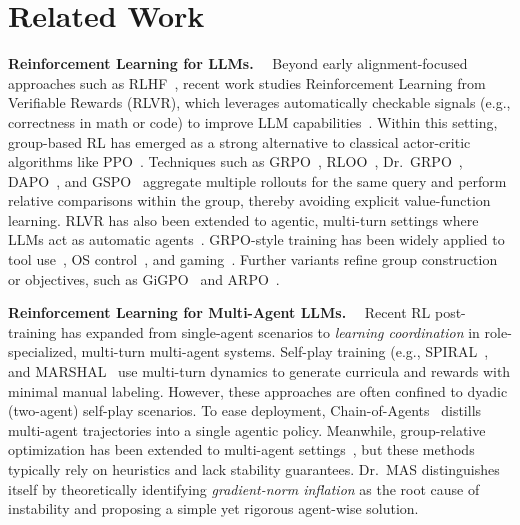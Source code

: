 \documentclass[]{fairmeta}
\theoremstyle{plain}
\theoremstyle{definition}
\theoremstyle{remark}
\newcommand{\methodname}{Dr.\ MAS}
\begin{document}
\section{Related Work}
\textbf{Reinforcement Learning for LLMs.}~~
Beyond early alignment-focused approaches such as RLHF~\citep{ziegler2019fine,stiennon2020learning,ouyang2022training,rafailov2024direct}, recent work studies Reinforcement Learning from Verifiable Rewards (RLVR), which leverages automatically checkable signals (e.g., correctness in math or code) to improve LLM capabilities~\citep{zeng2025simplerl}.
Within this setting, group-based RL has emerged as a strong alternative to classical actor-critic algorithms like PPO~\citep{schulman2017proximal}. Techniques such as GRPO~\citep{shao2024deepseekmath}, RLOO~\citep{kool2019buy,ahmadian2024back},
Dr.~GRPO~\citep{liu2025understanding}, DAPO~\citep{yu2025dapo}, and GSPO~\citep{zheng2025group} aggregate multiple rollouts for the same query and perform relative comparisons within the group, thereby avoiding explicit value-function learning.
RLVR has also been extended to agentic, multi-turn settings where LLMs act as automatic agents~\citep{zhou2024archer,bai2024digirl,feng2025towards,wang2025spa,zhang2025agent,feng2026agentocr}. GRPO-style training has been widely applied to tool use~\citep{qian2025toolrl,xue2025simpletir}, OS control~\citep{lai2025computerrl}, and gaming~\citep{wang2025ragen}.
Further variants refine group construction or objectives, such as GiGPO~\citep{feng2025group} and ARPO~\citep{dong2025agentic}.


\textbf{Reinforcement Learning for Multi-Agent LLMs.}~~
Recent RL post-training has expanded from single-agent scenarios to \emph{learning coordination} in role-specialized, multi-turn multi-agent systems. Self-play training (e.g., SPIRAL~\citep{liu2025spiral}, and MARSHAL~\citep{yuan2025marshal} use multi-turn dynamics to generate curricula and rewards with minimal manual labeling. However, these approaches are often confined to dyadic (two-agent) self-play scenarios. To ease deployment, Chain-of-Agents~\citep{li2025chain} distills multi-agent trajectories into a single agentic policy. Meanwhile, group-relative optimization has been extended to multi-agent settings~\citep{liu2025llm,chen2025heterogeneous,li2025flow,park2025maporl,wan2025rema,xue2025comas,mo2025multi,hong2025multi}, but these methods typically rely on heuristics and lack stability guarantees. \methodname{} distinguishes itself by theoretically identifying \emph{gradient-norm inflation} as the root cause of instability and proposing a simple yet rigorous agent-wise solution.
\end{document}
